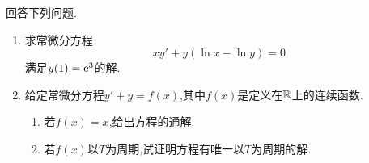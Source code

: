 \documentclass{ctexart}
\begin{document}
\begin{problem}[4.(20\songti{分})]
    回答下列问题.
    \begin{enumerate}[label=\tbf{(\arabic*)}]
        \item 求常微分方程
            \[xy'+y\left(\ln x-\ln y\right)=0\]
            满足$y(1)=\mathrm{e}^3$的解.
        \item 给定常微分方程$y'+y=f(x)$,其中$f(x)$是定义在$\mathbb{R}$上的连续函数.
            \begin{enumerate}[label=\tbf{(\alph*)}]
                \item 若$f(x)=x$,给出方程的通解.
                \item 若$f(x)$以$T$为周期,试证明方程有唯一以$T$为周期的解.
            \end{enumerate}
    \end{enumerate}    
\end{problem}
\end{document}

